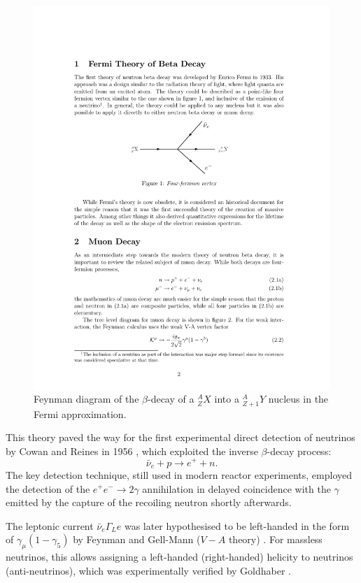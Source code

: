\begin{figure}
    \centering
    \includegraphics[width=0.7\linewidth]{figures/fermidecay.pdf}
    \caption{Feynman diagram of the $\beta$-decay of a $^{A}_{Z}X$ into a $^{A}_{Z+1}Y$ nucleus in the Fermi approximation.}
    \label{fig:fermibeta}
\end{figure}

This theory paved the way for the first experimental direct detection of neutrinos by Cowan and Reines in 1956 \cite{Cowan:1992xc}, which exploited the inverse $\beta$-decay process:
\begin{equation}
    \bar{\nu}_{e} + p \rightarrow e^{+} + n.
\end{equation}
The key detection technique, still used in modern reactor experiments, employed the detection of the $e^{+}e^{-}\rightarrow 2\gamma$ annihilation in delayed coincidence with the $\gamma$ emitted by the capture of the recoiling neutron shortly afterwards. 

The leptonic current $\bar{\nu}_{e}\Gamma_{L}e$ was later hypothesised to be left-handed in the form of $\gamma_{\mu}(1-\gamma_{5})$ by Feynman and Gell-Mann ($V-A$ theory) \cite{Feynman:1958ty}.
For massless neutrinos, this allows assigning a left-handed (right-handed) helicity to neutrinos (anti-neutrinos), which was experimentally verified by Goldhaber \cite{Goldhaber:1958nb}.

